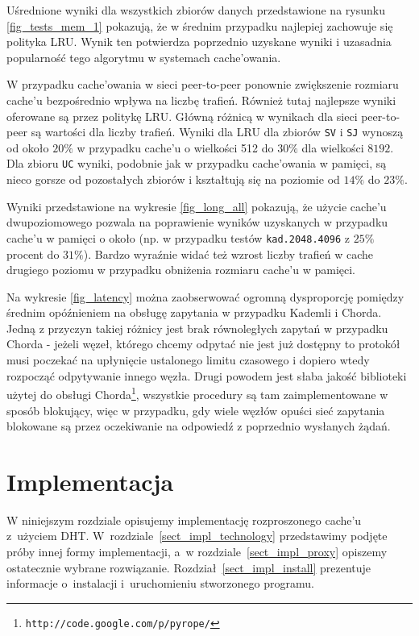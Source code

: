 \documentclass[a4paper,11pt]{scrartcl}
\newcommand{\f}{\texttt}
\newcommand{\s}{ }
\newcommand{\kesz}{cache}
\newcommand{\keszu}{cache'u}
\newcommand{\keszowania}{cache'owania}
\begin{document}
Uśrednione wyniki dla wszystkich zbiorów danych przedstawione na rysunku \ref{fig_tests_mem_1} pokazują, że w średnim przypadku najlepiej zachowuje się polityka LRU. Wynik ten potwierdza poprzednio uzyskane wyniki \cite{breslau1999web} i uzasadnia popularność tego algorytmu w systemach \keszowania. 

W przypadku \keszowania\s w sieci peer-to-peer ponownie zwiększenie rozmiaru \keszu\s bezpośrednio wpływa na liczbę trafień. Również tutaj najlepsze wyniki oferowane są przez politykę LRU. Główną różnicą w wynikach dla sieci peer-to-peer są wartości dla liczby trafień. Wyniki dla LRU dla zbiorów \f{SV} i \f{SJ} wynoszą od około $20\%$ w przypadku \keszu\s o wielkości 512 do $30\%$ dla wielkości $8192$. Dla zbioru \f{UC} wyniki, podobnie jak w przypadku \keszowania\s w pamięci, są nieco gorsze od pozostałych zbiorów i kształtują się na poziomie od $14\%$ do $23\%$.

Wyniki przedstawione na wykresie \ref{fig_long_all} pokazują, że użycie \keszu\s dwupoziomowego pozwala na poprawienie wyników uzyskanych w przypadku \keszu\s w pamięci o około  (np. w przypadku testów \f{kad.2048.4096} z $25\%$ procent do $31\%$). Bardzo wyraźnie widać też wzrost liczby trafień w \kesz\s drugiego poziomu w przypadku obniżenia rozmiaru \keszu\s w pamięci.  

Na wykresie \ref{fig_latency} można zaobserwować ogromną dysproporcję pomiędzy średnim opóźnieniem na obsługę zapytania w przypadku Kademli i Chorda. Jedną z przyczyn takiej różnicy jest brak równoległych zapytań w przypadku Chorda - jeżeli węzeł, którego chcemy odpytać nie jest już dostępny to protokół musi poczekać na upłynięcie ustalonego limitu czasowego i dopiero wtedy rozpocząć odpytywanie innego węzła. Drugi powodem jest słaba jakość biblioteki użytej do obsługi Chorda\footnote{\f{http://code.google.com/p/pyrope/}}, wszystkie procedury są tam zaimplementowane w sposób blokujący, więc w przypadku, gdy wiele węzłów opuści sieć zapytania blokowane są przez oczekiwanie na odpowiedź z poprzednio wysłanych żądań.

\section{Implementacja}
\label{sect_impl}
W niniejszym rozdziale opisujemy implementację rozproszonego \keszu\s z~użyciem DHT. W~rozdziale~\ref{sect_impl_technology}
przedstawimy podjęte próby innej formy implementacji, a~w rozdziale~\ref{sect_impl_proxy} opiszemy ostatecznie wybrane rozwiązanie.
Rozdział~\ref{sect_impl_install} prezentuje informacje o~instalacji i~uruchomieniu stworzonego programu.
\end{document}
